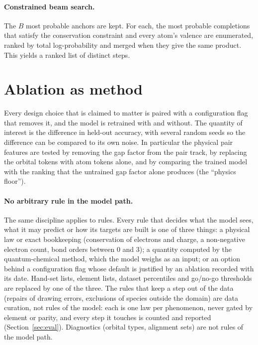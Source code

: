 \documentclass[11pt,a4paper]{article}
\begin{document}
\paragraph{Constrained beam search.} The $B$ most probable anchors are kept. For each, the most probable completions that satisfy the conservation constraint and every atom's valence are enumerated, ranked by total log-probability and merged when they give the same product. This yields a ranked list of distinct steps.

\section{Ablation as method}
\label{sec:ablation}
Every design choice that is claimed to matter is paired with a configuration flag that removes it, and the model is retrained with and without. The quantity of interest is the difference in held-out accuracy, with several random seeds so the difference can be compared to its own noise. In particular the physical pair features are tested by removing the gap factor from the pair track, by replacing the orbital tokens with atom tokens alone, and by comparing the trained model with the ranking that the untrained gap factor alone produces (the ``physics floor'').

\paragraph{No arbitrary rule in the model path.} The same discipline applies to rules. Every rule that decides what the model sees, what it may predict or how its targets are built is one of three things: a physical law or exact bookkeeping (conservation of electrons and charge, a non-negative electron count, bond orders between $0$ and $3$); a quantity computed by the quantum-chemical method, which the model weighs as an input; or an option behind a configuration flag whose default is justified by an ablation recorded with its date. Hand-set lists, element lists, dataset percentiles and go/no-go thresholds are replaced by one of the three. The rules that keep a step out of the data (repairs of drawing errors, exclusions of species outside the domain) are data curation, not rules of the model: each is one law per phenomenon, never gated by element or parity, and every step it touches is counted and reported (Section~\ref{sec:eval}). Diagnostics (orbital types, alignment sets) are not rules of the model path.

\end{document}

